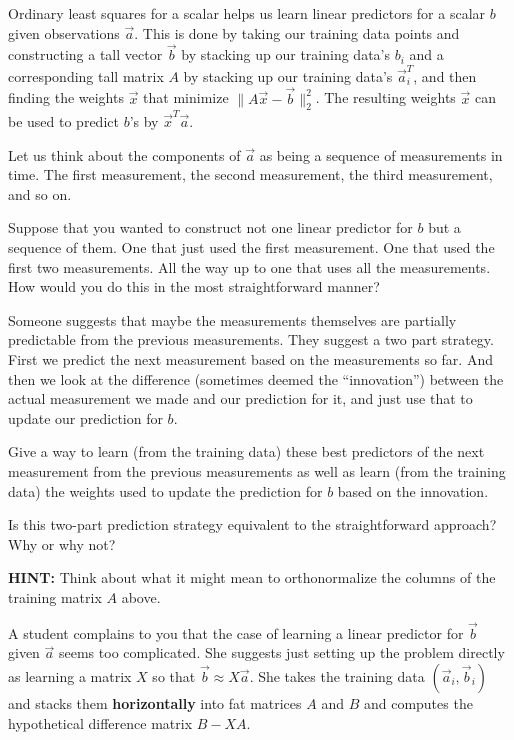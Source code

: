 \documentclass[11pt]{article}
\begin{document}
Ordinary least squares for a scalar helps us learn linear predictors for a
scalar $b$ given observations $\vec{a}$. This is done by taking our
training data points and constructing a tall vector $\vec{b}$ by
stacking up our training data's $b_i$ and a corresponding tall matrix
$A$ by stacking up our training data's $\vec{a}_i^T$, and then finding
the weights $\vec{x}$ that minimize $\| A \vec{x} - \vec{b} \|_2^2$. The
resulting weights $\vec{x}$ can be used to predict $b$'s by $\vec{x}^T
\vec{a}$. 

Let us think about the components of $\vec{a}$ as being a sequence of
measurements in time. The first measurement, the second measurement,
the third measurement, and so on. 

\begin{Parts}

\Part Suppose that you wanted to construct not one linear predictor
for $b$ but a sequence of them. One that just used the first measurement. One
that used the first two measurements. All the way up to one that uses
all the measurements. How would you do this in the most
straightforward manner?



\Part Someone suggests that maybe the measurements themselves are
partially predictable from the previous measurements. They suggest a
two part strategy. First we predict the next measurement based on the
measurements so far. And then we look at the difference (sometimes
deemed the ``innovation'') between the actual measurement we made and
our prediction for it, and just use that to update our prediction for $b$. 

Give a way to learn (from the training data) these best predictors of
the next measurement from the previous measurements as well as learn
(from the training data) the weights used to update the prediction for
$b$ based on the innovation. 



\Part Is this two-part prediction strategy equivalent to the
straightforward approach? Why or why not?

{\bf HINT: } Think about what it might mean to orthonormalize the
columns of the training matrix $A$ above.



 A student complains to you that the case of learning a linear
predictor for $\vec{b}$ given $\vec{a}$ seems too complicated. She
suggests just setting up the problem directly as learning a matrix $X$
so that $\vec{b} \approx X \vec{a}$. She takes the training data
$(\vec{a}_i, \vec{b}_i)$ and stacks them {\bf horizontally} into fat
matrices $A$ and $B$ and computes the hypothetical difference matrix
$B - XA$. 


\end{Parts}
\end{document}
